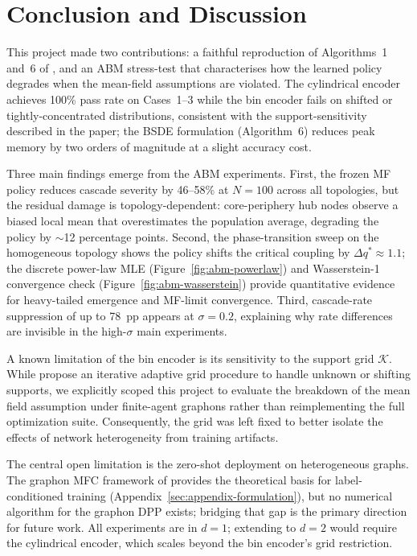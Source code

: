 \documentclass[11pt]{article}
\begin{document}
\section{Conclusion and Discussion}

This project made two contributions: a faithful reproduction of Algorithms~1 and~6 of \citet{pham2024mfnn}, and an ABM stress-test that characterises how the learned policy degrades when the mean-field assumptions are violated. The cylindrical encoder achieves 100\% pass rate on Cases~1--3 while the bin encoder fails on shifted or tightly-concentrated distributions, consistent with the support-sensitivity described in the paper; the BSDE formulation (Algorithm~6) reduces peak memory by two orders of magnitude at a slight accuracy cost.

Three main findings emerge from the ABM experiments. First, the frozen MF policy reduces cascade severity by 46--58\% at $N = 100$ across all topologies, but the residual damage is topology-dependent: core-periphery hub nodes observe a biased local mean that overestimates the population average, degrading the policy by $\sim$12 percentage points. Second, the phase-transition sweep on the homogeneous topology shows the policy shifts the critical coupling by $\Delta q^* \approx 1.1$; the discrete power-law MLE (Figure~\ref{fig:abm-powerlaw}) and Wasserstein-1 convergence check (Figure~\ref{fig:abm-wasserstein}) provide quantitative evidence for heavy-tailed emergence and MF-limit convergence. Third, cascade-rate suppression of up to 78~pp appears at $\sigma = 0.2$, explaining why rate differences are invisible in the high-$\sigma$ main experiments.

A known limitation of the bin encoder is its sensitivity to the support grid $\mathcal{K}$. While \citet{pham2024mfnn} propose an iterative adaptive grid procedure to handle unknown or shifting supports, we explicitly scoped this project to evaluate the breakdown of the mean field assumption under finite-agent graphons rather than reimplementing the full optimization suite. Consequently, the grid was left fixed to better isolate the effects of network heterogeneity from training artifacts.

The central open limitation is the zero-shot deployment on heterogeneous graphs. The graphon MFC framework of \citet{decrescenzo2025mfc} provides the theoretical basis for label-conditioned training (Appendix~\ref{sec:appendix-formulation}), but no numerical algorithm for the graphon DPP exists; bridging that gap is the primary direction for future work. All experiments are in $d = 1$; extending to $d = 2$ would require the cylindrical encoder, which scales beyond the bin encoder's grid restriction.
\end{document}
